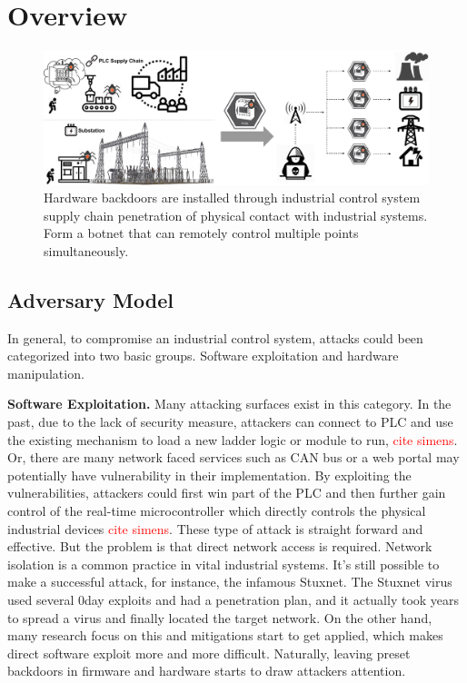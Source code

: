 \section{Overview}

\begin{figure}[ht]
	\includegraphics[width=\textwidth]{figures/bigpic}
	\centering
	\caption{Hardware backdoors are installed through industrial control system supply chain penetration of physical contact with industrial systems. Form a botnet that can remotely control multiple points simultaneously.}
	\label{fig:bigpic}
\end{figure}

\subsection{Adversary Model}



In general, to compromise an industrial control system, attacks could been categorized into two basic groups. Software exploitation and hardware manipulation.

\textbf{Software Exploitation.} Many attacking surfaces exist in this category. In the past, due to the lack of security measure, attackers can connect to PLC and use the existing mechanism to load a new ladder logic or module to run, \textcolor{red}{cite simens}. Or, there are many network faced services such as CAN bus or a web portal may potentially have vulnerability in their implementation. By exploiting the vulnerabilities, attackers could first win part of the PLC and then further gain control of the real-time microcontroller which directly controls the physical industrial devices \textcolor{red}{cite simens}. These type of attack is straight forward and effective. But the problem is that direct network access is required. Network isolation is a common practice in vital industrial systems. It's still possible to make a successful attack, for instance, the infamous Stuxnet. The Stuxnet virus used several 0day exploits and had a  penetration plan, and it actually took years to spread a virus and finally located the target network. On the other hand, many research focus on this and mitigations start to get applied, which makes direct software exploit more and more difficult. Naturally, leaving preset backdoors in firmware and hardware starts to draw attackers attention.  


